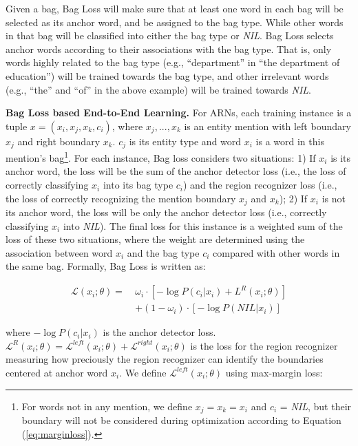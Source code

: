 \documentclass[11pt,a4paper]{article}
\begin{document}
Given a bag, Bag Loss will make sure that at least one word in each bag will be selected as its anchor word, and be assigned to the bag type. While other words in that bag will be classified into either the bag type or \emph{NIL}. Bag Loss selects anchor words according to their associations with the bag type. That is, only words highly related to the bag type (e.g., ``department'' in ``the department of education'') will be trained towards the bag type, and other irrelevant words (e.g., ``the'' and ``of'' in the above example) will be trained towards \emph{NIL}.

\noindent \textbf{Bag Loss based End-to-End Learning.} For ARNs, each training instance is a tuple $x = (x_i,x_j,x_k,c_i)$, where $x_j,...,x_k$ is an entity mention with left boundary $x_j$ and right boundary $x_k$. $c_j$ is its entity type and word $x_i$ is a word in this mention's bag\footnote{For words not in any mention, we define $x_j= x_k=x_i$ and $c_i$ = \emph{NIL}, but their boundary will not be considered during optimization according to Equation (\ref{eq:marginloss}).}. For each instance, Bag loss considers two situations: 1) If $x_i$ is its anchor word, the loss will be the sum of the anchor detector loss (i.e., the loss of correctly classifying $x_i$ into its bag type $c_i$) and the region recognizer loss (i.e., the loss of correctly recognizing the mention boundary $x_j$ and $x_k$); 2) If $x_i$ is not its anchor word, the loss will be only the anchor detector loss (i.e., correctly classifying $x_i$ into \emph{NIL}). The final loss for this instance is a weighted sum of the loss of these two situations, where the weight are determined using the association between word $x_i$ and the bag type $c_i$ compared with other words in the same bag. Formally, Bag Loss is written as:

\begin{small}
\begin{equation}
\begin{aligned}
\mathcal{L}(x_i;\theta) =~&\omega_i \cdot [-\log P(c_{i}|x_i) + L^R(x_i;\theta)]\\
&+ (1- \omega_i ) \cdot [-\log P(NIL|x_i)]
\end{aligned}
\label{eq:bagloss}
\end{equation}
\end{small}where $- \log P(c_{i}|x_i)$ is the anchor detector loss. $\mathcal{L}^R(x_i;\theta) = \mathcal{L}^{left}(x_i;\theta) +  \mathcal{L}^{right}(x_i;\theta)$ is the loss for the region recognizer measuring how preciously the region recognizer can identify the boundaries centered at anchor word $x_i$. We define $\mathcal{L}^{left}(x_i;\theta)$ using max-margin loss:
\end{document}
